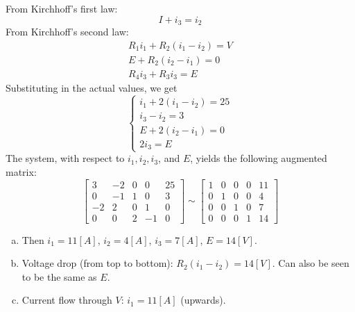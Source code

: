 \vspace{2mm}
From Kirchhoff's first law:
$$
I+i_3=i_2
$$
From Kirchhoff's second law:
\begin{eqnarray*}
  R_1i_1+R_2(i_1-i_2)=V\\
	E+R_2(i_2-i_1)=0\\
	R_4i_3+R_3i_3=E
\end{eqnarray*}
Substituting in the actual values, we get
$$
\left\{\begin{array}{c}i_1+2 (i_1-i_2)=25\\ i_3-i_2=3\\ E+2(i_2-i_1)=0\\2i_3=E \end{array}\right.
$$
The system, with respect to $i_1,i_2,i_3$, and $E$, yields the following augmented matrix:
\[
\left[\begin{array}{cccc|c} 3 &-2 &0&0&25 \\ 0&-1&1&0&3 \\ -2&2&0&1&0 \\ 0&0&2&-1&0\end{array}\right] \sim 
\left[\begin{array}{cccc|c} 1 & 0 &0&0& 11\\ 0&1&0&0&4 \\ 0&0&1&0&7 \\ 0&0&0&1&14\end{array}\right]
\]
\begin{enumerate}[a)]
\item Then $i_1=11[A]$, $i_2=4[A]$, $i_3=7[A]$, $E=14[V]$.
\item Voltage drop (from top to bottom): $R_2(i_1-i_2)=14[V]$. Can also be seen to be the same as $E$. 
\item Current flow through $V$: $i_1=11 [A]$ (upwards).
\end{enumerate}

